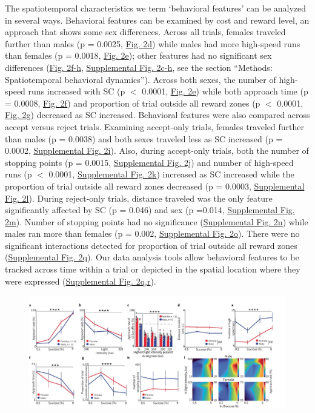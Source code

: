 \documentclass{article}
\begin{document}
\vspace{1em}

The spatiotemporal characteristics we term ‘behavioral features’ can be analyzed in several ways. Behavioral features can be examined by cost and reward level, an approach that shows some sex differences. Across all trials, females traveled further than males (p = 0.0025, \hyperref[fig:Record_main_2]{Fig. 2d}) while males had more high-speed runs than females (p = 0.0018, \hyperref[fig:Record_main_2]{Fig. 2e}); other features had no significant sex differences (\hyperref[fig:Record_main_2]{Fig. 2f-h}, \hyperref[fig:Record_SI_2]{Supplemental Fig. 2c-h}, see the section “Methods: Spatiotemporal behavioral dynamics”). Across both sexes, the number of high-speed runs increased with SC (p $<$ 0.0001, \hyperref[fig:Record_main_2]{Fig. 2e}) while both approach time (p = 0.0008, \hyperref[fig:Record_main_2]{Fig. 2f}) and proportion of trial outside all reward zones (p $<$ 0.0001, \hyperref[fig:Record_main_2]{Fig. 2g}) decreased as SC increased. Behavioral features were also compared across accept versus reject trials. Examining accept-only trials, females traveled further than males (p = 0.0038) and both sexes traveled less as SC increased (p = 0.0002, \hyperref[fig:Record_SI_2]{Supplemental Fig. 2i}). Also, during accept-only trials, both the number of stopping points (p = 0.0015, \hyperref[fig:Record_SI_2]{Supplemental Fig. 2j}) and number of high-speed runs (p $<$ 0.0001, \hyperref[fig:Record_SI_2]{Supplemental Fig. 2k}) increased as SC increased while the proportion of trial outside all reward zones decreased (p = 0.0003, \hyperref[fig:Record_SI_2]{Supplemental Fig. 2l}). During reject-only trials, distance traveled was the only feature significantly affected by SC (p = 0.046) and sex (p =0.014, \hyperref[fig:Record_SI_2]{Supplemental Fig. 2m}). Number of stopping points had no significance (\hyperref[fig:Record_SI_2]{Supplemental Fig. 2n}) while males ran more than females (p = 0.002, \hyperref[fig:Record_SI_2]{Supplemental Fig. 2o}). There were no significant interactions detected for proportion of trial outside all reward zones (\hyperref[fig:Record_SI_2]{Supplemental Fig. 2q}). Our data analysis tools allow behavioral features to be tracked across time within a trial or depicted in the spatial location where they were expressed (\hyperref[fig:Record_SI_2]{Supplemental Fig. 2q,r}).

\begin{figure}
  \centering
  \includegraphics[width=\textwidth]{Figs/Record_main_2.pdf}
\end{figure}
\end{document}
